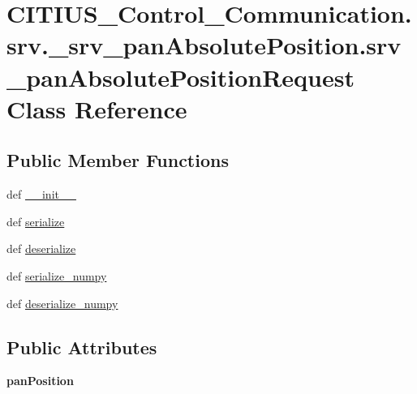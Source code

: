\hypertarget{class_c_i_t_i_u_s___control___communication_1_1srv_1_1__srv__pan_absolute_position_1_1srv__pan_absolute_position_request}{\section{\-C\-I\-T\-I\-U\-S\-\_\-\-Control\-\_\-\-Communication.\-srv.\-\_\-srv\-\_\-pan\-Absolute\-Position.\-srv\-\_\-pan\-Absolute\-Position\-Request \-Class \-Reference}
\label{class_c_i_t_i_u_s___control___communication_1_1srv_1_1__srv__pan_absolute_position_1_1srv__pan_absolute_position_request}
}
\subsection*{\-Public \-Member \-Functions}
\begin{DoxyCompactItemize}
\item 
def \hyperlink{class_c_i_t_i_u_s___control___communication_1_1srv_1_1__srv__pan_absolute_position_1_1srv__pan_absolute_position_request_a702c29d586ac5d6c330c1cf2910a3f7d}{\-\_\-\-\_\-init\-\_\-\-\_\-}
\item 
def \hyperlink{class_c_i_t_i_u_s___control___communication_1_1srv_1_1__srv__pan_absolute_position_1_1srv__pan_absolute_position_request_add3eade7c5e135dd023b4cfa90c5f70a}{serialize}
\item 
def \hyperlink{class_c_i_t_i_u_s___control___communication_1_1srv_1_1__srv__pan_absolute_position_1_1srv__pan_absolute_position_request_a790fe875a387137af449315a0d1df404}{deserialize}
\item 
def \hyperlink{class_c_i_t_i_u_s___control___communication_1_1srv_1_1__srv__pan_absolute_position_1_1srv__pan_absolute_position_request_ad515feb3f91a54f990eb7a131edce7a4}{serialize\-\_\-numpy}
\item 
def \hyperlink{class_c_i_t_i_u_s___control___communication_1_1srv_1_1__srv__pan_absolute_position_1_1srv__pan_absolute_position_request_a5cf5ce49f9e0efebf0a610ee41a68c8b}{deserialize\-\_\-numpy}
\end{DoxyCompactItemize}
\subsection*{\-Public \-Attributes}
\begin{DoxyCompactItemize}
\item 
\hypertarget{class_c_i_t_i_u_s___control___communication_1_1srv_1_1__srv__pan_absolute_position_1_1srv__pan_absolute_position_request_a1c5c2f38bffc4a0ff8af59049726d6ae}{{\bfseries pan\-Position}}\label{class_c_i_t_i_u_s___control___communication_1_1srv_1_1__srv__pan_absolute_position_1_1srv__pan_absolute_position_request_a1c5c2f38bffc4a0ff8af59049726d6ae}

\end{DoxyCompactItemize}
